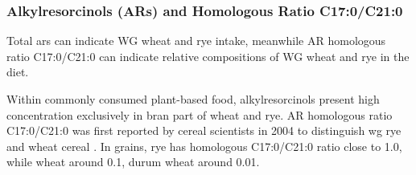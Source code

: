 \subsubsection{Alkylresorcinols (ARs) and Homologous Ratio C17:0/C21:0}
Total \acrfull{ars} can indicate WG wheat and rye intake, meanwhile AR homologous ratio C17:0/C21:0 can indicate relative compositions of WG wheat and rye in the diet.

Within commonly consumed plant-based food, alkylresorcinols present high concentration exclusively in bran part of wheat and rye. AR homologous ratio C17:0/C21:0 was first reported by cereal scientists in 2004 to distinguish \acrshort{wg} rye and wheat cereal \cite{Chen2004}. In grains, rye has homologous C17:0/C21:0 ratio close to 1.0, while wheat around 0.1, durum wheat around 0.01.

